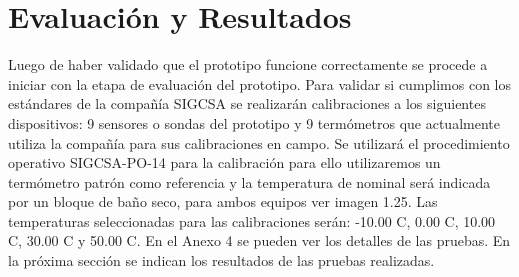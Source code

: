 \chapter{Evaluación y Resultados}

\par 
Luego de haber validado que el prototipo funcione correctamente se procede a iniciar con la etapa de evaluación del prototipo. Para validar si cumplimos con los estándares de la compañía SIGCSA se realizarán calibraciones a los siguientes dispositivos: 9 sensores o sondas del prototipo y 9 termómetros que actualmente utiliza la compañía para sus calibraciones en campo. Se utilizará el procedimiento operativo SIGCSA-PO-14 para la calibración para ello utilizaremos un termómetro patrón como referencia y la temperatura de nominal será indicada por un bloque de baño seco, para ambos equipos ver imagen 1.25.  Las temperaturas seleccionadas para las calibraciones serán: -10.00 C, 0.00 C, 10.00 C, 30.00 C y 50.00 C. En el Anexo 4 se pueden ver los detalles de las pruebas. En la próxima sección se indican los resultados de las pruebas realizadas.






